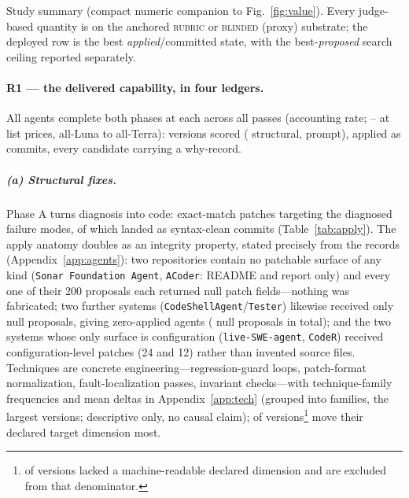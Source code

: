 \documentclass[11pt]{article}
\begin{document}
\begin{table}[t]\centering
\caption{Study summary (compact numeric companion to Fig.~\ref{fig:value}).
Every judge-based quantity is on the anchored \textsc{rubric} or \textsc{blinded}
(proxy) substrate; the deployed row is the best \emph{applied}/committed state,
with the best-\emph{proposed} search ceiling reported separately.}
\label{tab:glance}\footnotesize
\begin{adjustbox}{max width=\linewidth,center}\end{adjustbox}
\end{table}

\paragraph{R1 --- the delivered capability, in four ledgers.}
All \swN{} agents complete both phases at \swCostPerAgent{} each across all passes
(accounting rate; \swCostPerAgentListLo--\swCostPerAgentListHi{} at list prices, all-Luna to all-Terra):
\swVersions{} versions scored (\swStructN{} structural, \swPromptN{} prompt),
\swApplied{} applied as commits, every candidate carrying a why-record.

\subparagraph{(a) Structural fixes.}
Phase A turns diagnosis into code: exact-match patches targeting the diagnosed
failure modes, \swApplied{} of which landed as syntax-clean commits
(Table~\ref{tab:apply}). The apply anatomy doubles as an integrity property, stated precisely from the
records (Appendix~\ref{app:agents}): two repositories contain no patchable
surface of any kind (\texttt{Sonar Foundation Agent}, \texttt{ACoder}: README
and report only) and every one of their 200 proposals each returned null patch
fields---nothing was fabricated; two further systems
(\texttt{CodeShellAgent}/\texttt{Tester}) likewise received only null
proposals, giving \swZeroApplied{} zero-applied agents (\swZeroPatchProps{}
null proposals in total); and the two
systems whose only surface is configuration (\texttt{live-SWE-agent},
\texttt{CodeR}) received configuration-level patches (24 and 12) rather than
invented source files. Techniques are concrete
engineering---regression-guard loops, patch-format normalization,
fault-localization passes, invariant checks---with technique-family frequencies
and mean deltas in Appendix~\ref{app:tech} (grouped into families, the largest
\swTechTopN{} versions; descriptive only, no causal claim); \swTargeting{} of \swTargetingN{} versions\footnote{\swTargetingSkip{} of \swVersions{} versions lacked a machine-readable declared dimension and are excluded from that denominator.} move
their declared target dimension most.
\end{document}
